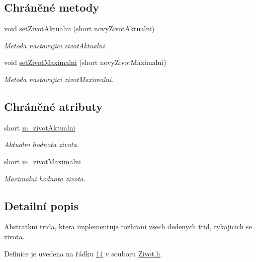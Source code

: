 \subsection*{Chráněné metody}
\begin{DoxyCompactItemize}
\item 
void \hyperlink{classIceAge_1_1Zivot_ac09b749a9007fb4a02ea9d7f5000627c}{set\+Zivot\+Aktualni} (short novy\+Zivot\+Aktualni)
\begin{DoxyCompactList}\small\item\em Metoda nastavujici zivot\+Aktualni. \end{DoxyCompactList}\item 
void \hyperlink{classIceAge_1_1Zivot_a39f5216f0b6a6dcae8a41543ca41c3bb}{set\+Zivot\+Maximalni} (short novy\+Zivot\+Maximalni)
\begin{DoxyCompactList}\small\item\em Metoda nastavujici zivot\+Maximalni. \end{DoxyCompactList}\end{DoxyCompactItemize}
\subsection*{Chráněné atributy}
\begin{DoxyCompactItemize}
\item 
short \hyperlink{classIceAge_1_1Zivot_a50f8dfc33d5affeb16709ee8e5b1e445}{m\+\_\+zivot\+Aktualni}
\begin{DoxyCompactList}\small\item\em Aktualni hodnota zivota. \end{DoxyCompactList}\item 
short \hyperlink{classIceAge_1_1Zivot_a256134d066a2b08095fc5a5fe50ac557}{m\+\_\+zivot\+Maximalni}
\begin{DoxyCompactList}\small\item\em Maximalni hodnota zivota. \end{DoxyCompactList}\end{DoxyCompactItemize}


\subsection{Detailní popis}
Abstratkni trida, ktera implementuje rozhrani vsech dedenych trid, tykajicich se zivota. 

Definice je uvedena na řádku \hyperlink{Zivot_8h_source_l00014}{14} v souboru \hyperlink{Zivot_8h_source}{Zivot.\+h}.



